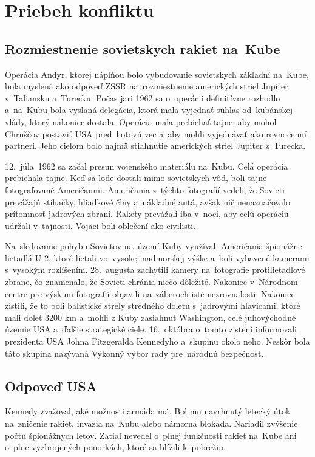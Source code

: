\documentclass[a4paper]{article}
\begin{document}
\newpage

\section{Priebeh konfliktu}
\subsection{Rozmiestnenie sovietskych rakiet na~Kube}
Operácia Andyr, ktorej náplňou bolo vybudovanie sovietskych základní na~Kube, bola myslená ako odpoveď ZSSR na~rozmiestnenie amerických striel Jupiter v~Taliansku a~Turecku. Počas jari 1962 sa o~operácii definitívne rozhodlo a~na~Kubu bola vyslaná delegácia, ktorá mala vyjednať súhlas od~kubánskej vlády, ktorý nakoniec dostala. Operácia mala prebiehať tajne, aby mohol Chruščov postaviť USA pred~hotovú vec a~aby mohli vyjednávať ako rovnocenní partneri. Jeho cieľom bolo najmä stiahnutie amerických striel Jupiter z~Turecka.

12.~júla~1962 sa začal presun vojenského materiálu na~Kubu. Celá operácia prebiehala tajne. Keď sa lode dostali mimo sovietskych vôd, boli tajne fotografované Američanmi. Američania z~týchto fotografií vedeli, že Sovieti prevážajú stíhačky, hliadkové člny a~nákladné autá, avšak nič nenaznačovalo prítomnosť jadrových zbraní. Rakety prevážali iba v~noci, aby celú operáciu udržali v~tajnosti. Vojaci boli oblečení ako civilisti. \cite{13days}

Na~sledovanie pohybu Sovietov na~území Kuby využívali Američania špionážne lietadlá U-2, ktoré lietali vo~vysokej nadmorskej výške a~boli vybavené kamerami s~vysokým rozlíšením. 28.~augusta zachytili kamery na~fotografie protilietadlové zbrane, čo znamenalo, že Sovieti chránia niečo dôležité. Nakoniec v~Národnom centre pre výskum fotografií objavili na~záberoch isté nezrovnalosti. Nakoniec zistili, že to boli balistické strely stredného doletu s~jadrovými hlavicami, ktoré mali dolet 3200 km a~mohli z Kuby zasiahnuť Washington, celé juhovýchodné územie USA a~ďalšie strategické ciele. 16.~októbra o~tomto zistení informovali prezidenta USA Johna Fitzgeralda Kennedyho a~skupinu okolo neho. Neskôr bola táto skupina nazývaná Výkonný výbor rady pre~národnú bezpečnosť.

\subsection{Odpoveď USA}
Kennedy zvažoval, aké možnosti armáda má. Bol mu navrhnutý letecký útok na~zničenie rakiet, invázia na~Kubu alebo námorná blokáda. Nariadil zvýšenie počtu špionážnych letov. Zatiaľ nevedel o~plnej funkčnosti rakiet na~Kube ani o~plne vyzbrojených ponorkách, ktoré sa blížili k~pobrežiu.
\end{document}
